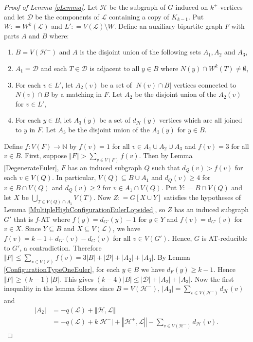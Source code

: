 \documentclass[10pt]{article}
\renewcommand{\ge}{\geqslant}
\renewcommand{\le}{\leqslant}
\theoremstyle{plain}
\theoremstyle{definition}
\theoremstyle{remark}
\newcommand{\fancy}[1]{\mathcal{#1}}
\newcommand{\IN}{\mathbb{N}}
\newcommand{\D}{\fancy{D}}
\renewcommand{\L}{\fancy{L}}
\newcommand{\HH}{\fancy{H}}
\newcommand{\card}[1]{\left|#1\right|}
\newcommand{\size}[1]{\left\Vert#1\right\Vert}
\newcommand{\func}[3]{#1\colon #2 \rightarrow #3}
\newcommand{\DefinedAs}{\mathrel{\mathop:}=}
\def\D{\fancy{D}}
\begin{document}
\begin{proof}[Proof of Lemma \ref{qLemma}]
Let $\HH$ be the subgraph of $G$ induced on $k^+$-vertices and let $\D$ be the components of $\L$ containing a copy of $K_{k-1}$. 
Put $W \DefinedAs W^k(\L)$ and $L' \DefinedAs V(\L) \setminus W$. Define an auxiliary bipartite graph $F$ with parts $A$ and $B$ where:
\begin{enumerate}
\item  $B = V(\HH^-)$ and $A$ is the disjoint union of the following sets
$A_1, A_2$ and $A_3$,
\item $A_1 = \D$ and each $T \in \D$ is adjacent to all $y \in B$
where $N(y) \cap W^k(T) \ne \emptyset$,
\item For each $v \in L'$, let $A_2(v)$ be a set of $\card{N(v) \cap
B}$ vertices connected to $N(v) \cap B$ by a matching in $F$.  Let
$A_2$ be the disjoint union of the $A_2(v)$ for $v \in L'$,
\item For each $y \in B$, let $A_3(y)$ be a set of $d_{\HH}(y)$ vertices
which are all joined to $y$ in $F$.  Let $A_3$ be the disjoint union
of the $A_3(y)$ for $y \in B$.
\end{enumerate}

Define $\func{f}{V(F)}{\IN}$ by $f(v) = 1$ for all $v \in A_1 \cup A_2 \cup A_3$ and $f(v) = 3$ for all $v \in B$.  First, suppose $\size{F} > \sum_{v \in V(F)} f(v)$.  
Then by Lemma \ref{DegenerateEuler}, $F$ has an induced subgraph $Q$ such that $d_Q(v) > f(v)$ for each $v \in V(Q)$.  
In particular, $V(Q) \subseteq B \cup A_1$ and $d_Q(v) \ge 4$ for $v \in B \cap V(Q)$ and $d_Q(v) \ge 2$ for $v \in A_1 \cap V(Q)$.  
Put $Y \DefinedAs B \cap V(Q)$ and let $X$ be $\bigcup_{T \in V(Q) \cap A_1} V(T)$. 
Now $Z \DefinedAs G[X \cup Y]$ satisfies the hypotheses of Lemma \ref{MultipleHighConfigurationEulerLopsided}, so $Z$ has an induced subgraph $G'$ that is $f$-AT 
where $f(y) = d_{G'}(y) - 1$ for $y \in Y$ and $f(v) = d_{G'}(v)$ for $v \in X$.  Since $Y \subseteq B$ and $X \subseteq V(\L)$, we have $f(v) = k-1 + d_{G'}(v) - d_G(v)$ for all $v \in V(G')$.  
Hence, $G$ is AT-reducible to $G'$, a contradiction.
Therefore $\size{F} \le \sum_{v \in V(F)} f(v) = 3\card{B} + \card{\D} + \card{A_2} + \card{A_3}$. 
By Lemma \ref{ConfigurationTypeOneEuler}, for each $y \in B$ we have $d_F(y) \ge k-1$.  
Hence $\size{F} \ge (k-1)\card{B}$.  This gives $(k-4)\card{B} \le \card{\D} + \card{A_2} + \card{A_3}$.  
Now the first inequality in the lemma follows since $B = V(\HH^-)$, $\card{A_3} = \sum_{v \in V(\HH^-)} d_{\HH}(v)$ and
\begin{align*}
\card{A_2} &= -q(\L) + \size{\HH, \L} \\
&= -q(\L) + k\card{\HH^-}+ \size{\HH^+, \L} - \sum_{v \in V(\HH^-)} d_{\HH}(v).
\end{align*}


\end{proof}
\end{document}
